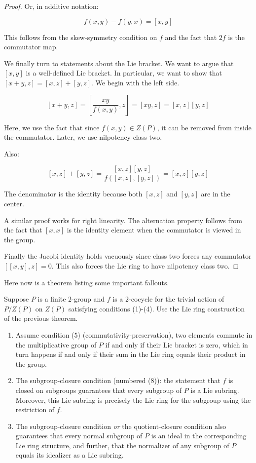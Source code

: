 \documentclass[10pt]{amsart}
\begin{document}
\begin{proof}
  Or, in additive notation:

  $$f(x,y) - f(y,x) = [x,y]$$

  This follows from the skew-symmetry condition on $f$ and the fact
  that $2f$ is the commutator map.

  We finally turn to statements about the Lie bracket. We want to
  argue that $[x,y]$ is a well-defined Lie bracket. In particular, we
  want to show that $[x + y,z] = [x,z] + [y,z]$. We begin with the left side.

  $$[x + y,z] = [\frac{xy}{f(x,y)},z] = [xy,z] = [x,z][y,z]$$

  Here, we use the fact that since $f(x,y) \in Z(P)$, it can be
  removed from inside the commutator. Later, we use nilpotency class two.

  Also:

  $$[x,z] + [y,z] = \frac{[x,z][y,z]}{f([x,z],[y,z])} = [x,z][y,z]$$

  The denominator is the identity because both $[x,z]$ and $[y,z]$ are
  in the center.

  A similar proof works for right linearity. The alternation property
  follows from the fact that $[x,x]$ is the identity element when the
  commutator is viewed in the group.

  Finally the Jacobi identity holds vacuously since class two forces
  any commutator $[[x,y],z] = 0$. This also forces the Lie ring to
  have nilpotency class two.
\end{proof}

Here now is a theorem listing some important fallouts.

\begin{theorem}\label{lazardgrouptoringmore}
  Suppose $P$ is a finite $2$-group and $f$ is a $2$-cocycle for the
  trivial action of $P/Z(P)$ on $Z(P)$ satisfying conditions
  (1)-(4). Use the Lie ring construction of the previous theorem.

  \begin{enumerate}
  \item Assume condition (5) (commutativity-preservation), two
    elements commute in the multiplicative group of $P$ if and only if
    their Lie bracket is zero, which in turn happens if and only if
    their sum in the Lie ring equals their product in the group.
  \item The subgroup-closure condition (numbered (8)): the statement
    that $f$ is closed on subgroups guarantees that every subgroup of
    $P$ is a Lie subring. Moreover, this Lie subring is precisely the
    Lie ring for the subgroup using the restriction of $f$.
  \item The subgroup-closure condition {\em or} the quotient-closure
    condition also guarantees that every normal subgroup of $P$ is an
    ideal in the corresponding Lie ring structure, and further, that
    the normalizer of any subgroup of $P$ equals its idealizer as a
    Lie subring.
  \end{enumerate}
\end{theorem}
\end{document}
